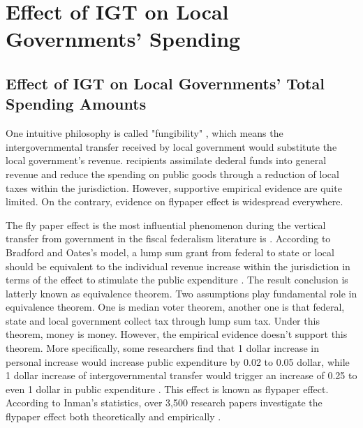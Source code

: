 \section{Effect of IGT on Local Governments' Spending}

\subsection{Effect of IGT on Local Governments' Total Spending Amounts}

One intuitive philosophy is called "fungibility" \cite{pack1993foreign}, which means the intergovernmental transfer received by local government would substitute the local government's revenue. recipients assimilate dederal funds into general revenue and reduce the spending on public goods through a reduction of local taxes within the jurisdiction. However, supportive empirical evidence are quite limited. On the contrary, evidence on flypaper effect is widespread everywhere.

The fly paper effect is the most influential phenomenon during the vertical transfer from government in the fiscal federalism literature is  \cite{hines1995anomalies,gamkhar2007impact}. According to Bradford and Oates’s model, a lump sum grant from federal to state or local should be equivalent to the individual revenue increase within the jurisdiction in terms of the effect to stimulate the public expenditure \cite{bradford1971analysis}. The result conclusion is latterly known as equivalence theorem. Two assumptions play fundamental role in equivalence theorem. One is median voter theorem, another one is that federal, state and local government collect tax through lump sum tax. Under this theorem, money is money. However, the empirical evidence doesn’t support this theorem. More specifically, some researchers find that 1 dollar increase in personal increase would increase public expenditure by 0.02 to 0.05 dollar, while 1 dollar increase of intergovernmental transfer would trigger an increase of 0.25 to even 1 dollar in public expenditure \cite{bailey1998flypaper,dollery1996empirical,gamkhar2007impact}. This effect is known as flypaper effect. According to Inman's statistics, over 3,500 research papers investigate the flypaper effect both theoretically and empirically \cite{inman2008flypaper}.

